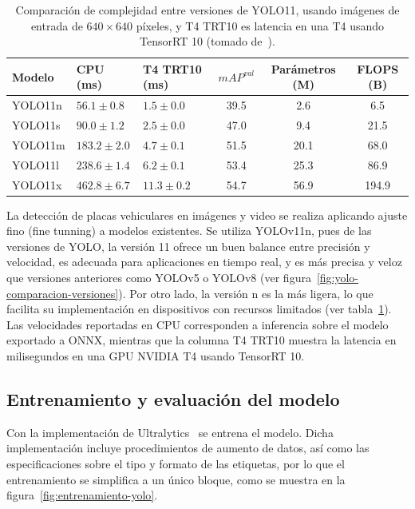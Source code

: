 \begin{table}[h]
    \centering
    \begin{tabularx}{\textwidth}{lXXccc}
        \toprule
        \textbf{Modelo} 
        & \textbf{CPU (ms)} 
		& \textbf{T4 TRT10 (ms)}
        & \textbf{$mAP^{val}$} 
        & \textbf{Parámetros (M)} 
        & \textbf{FLOPS (B)} \\
        \midrule
        YOLO11n & $56.1 \pm 0.8$ & $1.5 \pm 0.0$ & 39.5 & 2.6 & 6.5 \\
        YOLO11s & $90.0 \pm 1.2$ & $2.5 \pm 0.0$ & 47.0 & 9.4 & 21.5 \\
        YOLO11m & $183.2 \pm 2.0$ & $4.7 \pm 0.1$ & 51.5 & 20.1 & 68.0 \\
        YOLO11l & $238.6 \pm 1.4$ & $6.2 \pm 0.1$ & 53.4 & 25.3 & 86.9 \\
        YOLO11x & $462.8 \pm 6.7$ & $11.3 \pm 0.2$ & 54.7 & 56.9 & 194.9 \\
        \bottomrule
    \end{tabularx}
    \caption{Comparación de complejidad entre versiones de YOLO11, 
	usando imágenes de entrada de $640\times640$ píxeles, y T4 TRT10 es latencia en una T4
	usando TensorRT 10 (tomado de~\cite{yolo11_ultralytics}).}
    \label{tab:yolo11-comparacion-complejidad}
\end{table}

La detección de placas vehiculares en imágenes y video se realiza aplicando ajuste fino (fine tunning)
a modelos existentes. Se utiliza YOLOv11n, pues de las versiones de YOLO, la versión 11 ofrece
un buen balance entre precisión y velocidad, es adecuada para aplicaciones en tiempo real,
y es más precisa y veloz que versiones anteriores como YOLOv5 o YOLOv8 (ver figura~\ref{fig:yolo-comparacion-versiones}).
Por otro lado, la versión n es la más ligera, lo que facilita su implementación en dispositivos
con recursos limitados (ver tabla~\ref{tab:yolo11-comparacion-complejidad}).
Las velocidades reportadas en CPU corresponden a inferencia sobre el modelo exportado a ONNX, mientras que la columna
T4 TRT10 muestra la latencia en milisegundos en una GPU NVIDIA T4 usando TensorRT 10.

\subsection{Entrenamiento y evaluación del modelo}

Con la implementación de Ultralytics~\cite{Jocher_Ultralytics_YOLO_2023} se entrena el modelo. 
Dicha implementación incluye procedimientos de aumento de datos, 
así como las especificaciones sobre el tipo y formato de las etiquetas, 
por lo que el entrenamiento se simplifica a un único bloque, 
como se muestra en la figura~\ref{fig:entrenamiento-yolo}.

